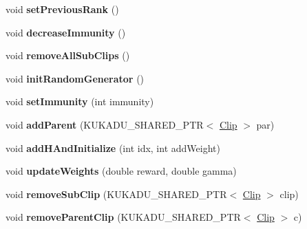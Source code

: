 \begin{DoxyCompactItemize}
\item 
void {\bfseries set\+Previous\+Rank} ()\hypertarget{classkukadu_1_1Clip_ab63c6f4922b2e61d5caedae2ab4e9566}{}\label{classkukadu_1_1Clip_ab63c6f4922b2e61d5caedae2ab4e9566}

\item 
void {\bfseries decrease\+Immunity} ()\hypertarget{classkukadu_1_1Clip_a3d532729bf05cebcfcf049be5c15383b}{}\label{classkukadu_1_1Clip_a3d532729bf05cebcfcf049be5c15383b}

\item 
void {\bfseries remove\+All\+Sub\+Clips} ()\hypertarget{classkukadu_1_1Clip_a72e5e78f3bdc0f80c32e4775e37d4b04}{}\label{classkukadu_1_1Clip_a72e5e78f3bdc0f80c32e4775e37d4b04}

\item 
void {\bfseries init\+Random\+Generator} ()\hypertarget{classkukadu_1_1Clip_a5cfdcf67876c3856b65f6bceb07a0cfd}{}\label{classkukadu_1_1Clip_a5cfdcf67876c3856b65f6bceb07a0cfd}

\item 
void {\bfseries set\+Immunity} (int immunity)\hypertarget{classkukadu_1_1Clip_ab31cf5283dab670017ae01e5ebf35afb}{}\label{classkukadu_1_1Clip_ab31cf5283dab670017ae01e5ebf35afb}

\item 
void {\bfseries add\+Parent} (K\+U\+K\+A\+D\+U\+\_\+\+S\+H\+A\+R\+E\+D\+\_\+\+P\+TR$<$ \hyperlink{classkukadu_1_1Clip}{Clip} $>$ par)\hypertarget{classkukadu_1_1Clip_a9f8015a0b15359f9ce5101cfa01954ba}{}\label{classkukadu_1_1Clip_a9f8015a0b15359f9ce5101cfa01954ba}

\item 
void {\bfseries add\+H\+And\+Initialize} (int idx, int add\+Weight)\hypertarget{classkukadu_1_1Clip_a79f9730aaded88c922fc1693582b62e0}{}\label{classkukadu_1_1Clip_a79f9730aaded88c922fc1693582b62e0}

\item 
void {\bfseries update\+Weights} (double reward, double gamma)\hypertarget{classkukadu_1_1Clip_a6845f2bed6e81c012c3475e0497b0448}{}\label{classkukadu_1_1Clip_a6845f2bed6e81c012c3475e0497b0448}

\item 
void {\bfseries remove\+Sub\+Clip} (K\+U\+K\+A\+D\+U\+\_\+\+S\+H\+A\+R\+E\+D\+\_\+\+P\+TR$<$ \hyperlink{classkukadu_1_1Clip}{Clip} $>$ clip)\hypertarget{classkukadu_1_1Clip_a95eee9c3a13b7b202bfdf6d4b29603d9}{}\label{classkukadu_1_1Clip_a95eee9c3a13b7b202bfdf6d4b29603d9}

\item 
void {\bfseries remove\+Parent\+Clip} (K\+U\+K\+A\+D\+U\+\_\+\+S\+H\+A\+R\+E\+D\+\_\+\+P\+TR$<$ \hyperlink{classkukadu_1_1Clip}{Clip} $>$ c)\hypertarget{classkukadu_1_1Clip_a3d65cf6aadee55889068d9734ab4b9b9}{}\label{classkukadu_1_1Clip_a3d65cf6aadee55889068d9734ab4b9b9}


\end{DoxyCompactItemize}
